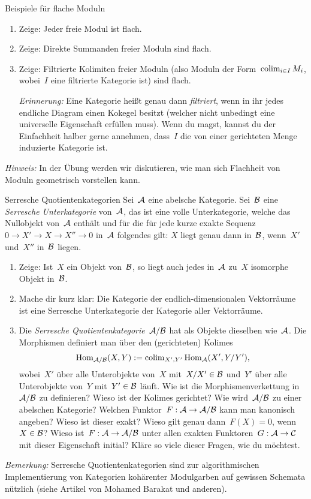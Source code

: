 \documentclass{uebblatt}
\begin{document}
\begin{aufgabe}{Beispiele für flache Moduln}
\begin{enumerate}
\item Zeige: Jeder freie Modul ist flach.
\item Zeige: Direkte Summanden freier Moduln sind flach.
\item Zeige: Filtrierte Kolimiten freier Moduln (also Moduln der
Form~$\operatorname{colim}_{i \in I} M_i$, wobei~$I$ eine filtrierte Kategorie ist) sind flach.

\emph{Erinnerung:} Eine Kategorie heißt genau dann \emph{filtriert}, wenn in
ihr jedes endliche Diagram einen Kokegel besitzt (welcher nicht unbedingt eine
universelle Eigenschaft erfüllen muss). Wenn du magst, kannst du der
Einfachheit halber gerne annehmen, dass~$I$ die von einer gerichteten Menge
induzierte Kategorie ist.
\end{enumerate}
\emph{Hinweis:} In der Übung werden wir diskutieren, wie man sich Flachheit von
Moduln geometrisch vorstellen kann.
\end{aufgabe}

\newpage

\begin{aufgabe}{Serresche Quotientenkategorien}
Sei~$\mathcal{A}$ eine abelsche Kategorie. Sei~$\mathcal{B}$ eine \emph{Serresche Unterkategorie}
von~$\mathcal{A}$, das ist eine volle Unterkategorie, welche das Nullobjekt von~$\mathcal{A}$
enthält und für die für jede kurze exakte Sequenz~$0 \to X' \to X \to X'' \to 0$
in~$\mathcal{A}$ folgendes gilt: $X$ liegt genau dann in~$\mathcal{B}$, wenn~$X'$ und~$X''$
in~$\mathcal{B}$ liegen.
\begin{enumerate}
\item Zeige: Ist~$X$ ein Objekt von~$\mathcal{B}$, so liegt auch jedes in~$\mathcal{A}$ zu~$X$ isomorphe
Objekt in~$\mathcal{B}$.
\item Mache dir kurz klar: Die Kategorie der endlich-dimensionalen
Vektorräume ist eine Serresche Unterkategorie der Kategorie aller Vektorräume.
\item Die \emph{Serresche Quotientenkategorie}~$\mathcal{A}/\mathcal{B}$ hat als Objekte
dieselben wie~$\mathcal{A}$. Die Morphismen definiert man über den (gerichteten) Kolimes
\[ \mathrm{Hom}_{\mathcal{A}/\mathcal{B}}(X,Y) := \operatorname{colim}_{X',Y'} \mathrm{Hom}_{\mathcal{A}}(X', Y/Y'), \]
wobei~$X'$ über alle Unterobjekte von~$X$ mit~$X/X' \in \mathcal{B}$ und~$Y'$ über alle
Unterobjekte von~$Y$ mit~$Y' \in \mathcal{B}$ läuft. Wie ist die Morphismenverkettung
in~$\mathcal{A}/\mathcal{B}$ zu definieren? Wieso ist der Kolimes gerichtet? Wie wird~$\mathcal{A}/\mathcal{B}$ zu einer abelschen Kategorie?
Welchen Funktor~$F : \mathcal{A} \to \mathcal{A}/\mathcal{B}$ kann man kanonisch angeben? Wieso ist dieser
exakt? Wieso gilt genau dann~$F(X) = 0$, wenn~$X \in \mathcal{B}$? Wieso ist~$F : \mathcal{A} \to
\mathcal{A}/\mathcal{B}$ unter allen exakten Funktoren~$G : \mathcal{A} \to \mathcal{C}$ mit dieser Eigenschaft
initial? Kläre so viele dieser Fragen, wie du möchtest.
\end{enumerate}
\emph{Bemerkung:} Serresche Quotientenkategorien sind zur algorithmischen
Implementierung von Kategorien kohärenter Modulgarben auf gewissen Schemata
nützlich (siehe Artikel von Mohamed Barakat und anderen).
\end{aufgabe}
\end{document}
